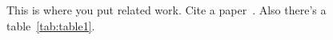 This is where you put related work. Cite a paper~\parencite{zhao2019modelling}.
Also there's a table~\cref{tab:table1}.
\blindtext

\blindtext[3]